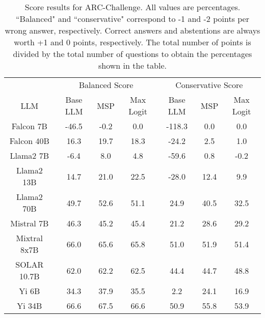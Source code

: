 \begin{table*}
\centering
\begin{tabular}{c|c|c|c|c|c|c}
& \multicolumn{3}{c|}{Balanced Score} & \multicolumn{3}{c}{Conservative Score} \\ 
LLM & Base LLM & MSP & Max Logit & Base LLM & MSP & Max Logit\\ \hline
Falcon 7B & -46.5 & -0.2 & 0.0 & -118.3 & 0.0 & 0.0\\
Falcon 40B & 16.3 & 19.7 & 18.3 & -24.2 & 2.5 & 1.0\\
Llama2 7B & -6.4 & 8.0 & 4.8 & -59.6 & 0.8 & -0.2\\
Llama2 13B & 14.7 & 21.0 & 22.5 & -28.0 & 12.4 & 9.9\\
Llama2 70B & 49.7 & 52.6 & 51.1 & 24.9 & 40.5 & 32.5\\
Mistral 7B & 46.3 & 45.2 & 45.4 & 21.2 & 28.6 & 29.2\\
Mixtral 8x7B & 66.0 & 65.6 & 65.8 & 51.0 & 51.9 & 51.4\\
SOLAR 10.7B & 62.0 & 62.2 & 62.5 & 44.4 & 44.7 & 48.8\\
Yi 6B & 34.3 & 37.9 & 35.5 & 2.2 & 24.1 & 16.9\\
Yi 34B & 66.6 & 67.5 & 66.6 & 50.9 & 55.8 & 53.9\\
\hline
\end{tabular}
\caption{Score results for ARC-Challenge. All values are percentages. ``Balanced" and ``conservative" correspond to -1 and -2 points per wrong answer, respectively. Correct answers and abstentions are always worth +1 and 0 points, respectively. The total number of points is divided by the total number of questions to obtain the percentages shown in the table.}
\label{tab:arc_score}
\end{table*}
